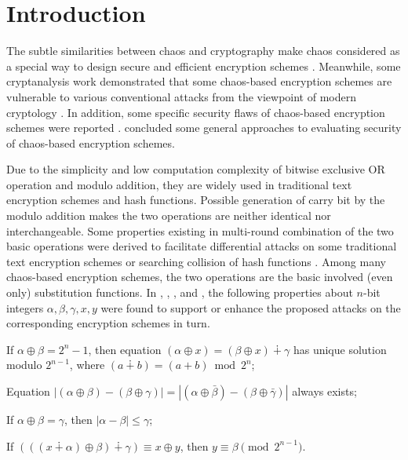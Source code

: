 \documentclass{ws-ijbc}
\begin{document}

\section{Introduction}

The subtle similarities between chaos and cryptography make chaos considered as a special way to
design secure and efficient encryption schemes \cite{YaobinMao:CSF2004,ChenJY:Joint:TCSII11}. Meanwhile,
some cryptanalysis work demonstrated that some chaos-based encryption schemes are vulnerable to various
conventional attacks from the viewpoint of modern cryptology \cite{LiShujun:YTSCipher:IEEETCASII2004,Xiao:ImproveTable:TCASII06,SolakErcan:AnaFridrich:BAC10,Solak:multichaotic:OC10}.
In addition, some specific security flaws of chaos-based encryption schemes were reported \cite{ZhouJT:Coder:TCSI11,FChen:PeriodArnold:TIT12}.
\cite{AlvarezLi:Rules:IJBC2006} concluded some general approaches to evaluating security of chaos-based encryption schemes.

Due to the simplicity and low computation complexity of bitwise exclusive OR operation and modulo addition, they are widely used in
traditional text encryption schemes and hash functions. Possible generation of carry bit by the modulo addition
makes the two operations are neither identical nor interchangeable. Some properties existing in multi-round combination of the two
basic operations were derived to facilitate differential attacks on some traditional text encryption schemes or searching collision of
hash functions \cite{Paul:Modulo:LNCS05,Wang:Hash:LNCS05}. Among many chaos-based encryption schemes, the two operations are
the basic involved (even only) substitution functions. In \cite{Li:AttackingISNN2005}, \cite{Li:AttackDSEA2006}, \cite{Li:AttackingRCES2008}, and \cite{Li:AttackingIVC2009}, the following properties about $n$-bit integers $\alpha, \beta, \gamma, x, y$ were found to support or enhance the proposed attacks on the corresponding encryption schemes in turn.
\begin{itemlist}
\item If $\alpha\oplus \beta=2^n-1$, then equation $(\alpha\oplus x)=(\beta\oplus x) \dotplus \gamma$ has unique solution modulo $2^{n-1}$,
where $(a\dotplus b)=(a+b)\bmod 2^n$;

\item Equation $|(\alpha\oplus \beta)-(\beta\oplus \gamma)|=|(\alpha\oplus\bar{\beta})-(\beta\oplus\bar{\gamma})|$ always exists;

\item If $\alpha\oplus \beta=\gamma$, then $|\alpha-\beta|\leq \gamma$;

\item If $(((x\dotplus \alpha)\oplus \beta)\dotplus \gamma)\equiv x\oplus y$, then $y\equiv \beta\pmod{2^{n-1}}$.
\end{itemlist}
\end{document}
